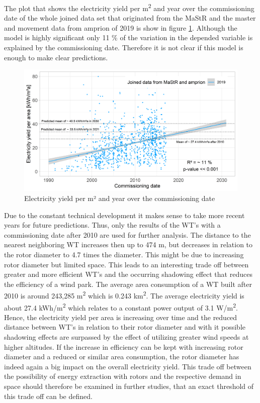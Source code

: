\documentclass[a4paper,11pt]{article}
\begin{document}
The plot that shows the electricity yield per m\textsuperscript{2} and year over the commissioning date of the whole joined data set that originated from the MaStR and the master and movement data from amprion of 2019 is show in figure \ref{fig:eyarea}. Although the model is highly significant only 11 \% of the variation in the depended variable is explained by the commissioning date. Therefore it is not clear if this model is enough to make clear predictions.
\begin{figure}

{\centering \includegraphics[width=1\linewidth]{data/MaStR_amprion_analysis/results_of_analysis/e_yield_per_m2_over_commissioning_date} 

}

\caption{Electricity yield per m² and year over the commissioning date}\label{fig:eyarea}
\end{figure}
Due to the constant technical development it makes sense to take more recent years for future predictions. Thus, only the results of the WT's with a commissioning date after 2010 are used for further analysis. The distance to the nearest neighboring WT increases then up to 474 m, but decreases in relation to the rotor diameter to 4.7 times the diameter. This might be due to increasing rotor diameter but limited space. This leads to an interesting trade off between greater and more efficient WT's and the occurring shadowing effect that reduces the efficiency of a wind park. The average area consumption of a WT built after 2010 is around 243,285 m\textsuperscript{2} which is 0.243 km\textsuperscript{2}. The average electricity yield is about 27.4 kWh/m\textsuperscript{2} which relates to a constant power output of 3.1 W/m\textsuperscript{2}. Hence, the electricity yield per area is increasing over time and the reduced distance between WT's in relation to their rotor diameter and with it possible shadowing effects are surpassed by the effect of utilizing greater wind speeds at higher altitudes. If the increase in efficiency can be kept with increasing rotor diameter and a reduced or similar area consumption, the rotor diameter has indeed again a big impact on the overall electricity yield. This trade off between the possibility of energy extraction with rotors and the respective demand in space should therefore be examined in further studies, that an exact threshold of this trade off can be defined.
\end{document}
